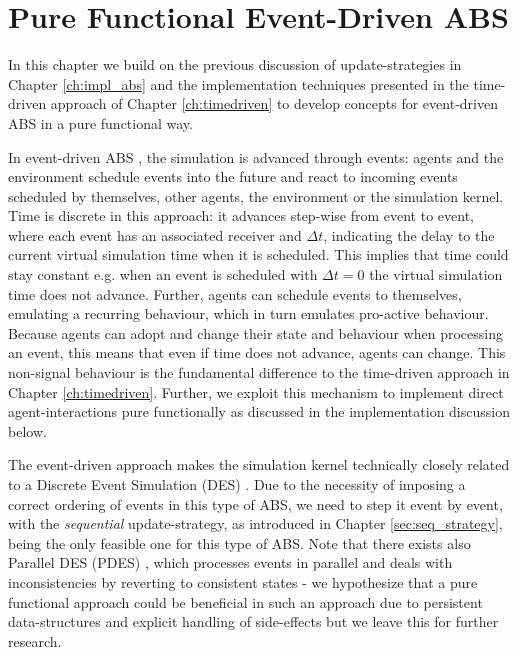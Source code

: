 \chapter{Pure Functional Event-Driven ABS}
\label{ch:eventdriven}

In this chapter we build on the previous discussion of update-strategies in Chapter \ref{ch:impl_abs} and the implementation techniques presented in the time-driven approach of Chapter \ref{ch:timedriven} to develop concepts for event-driven ABS in a pure functional way. 

In event-driven ABS \cite{meyer_event-driven_2014}, the simulation is advanced through events: agents and the environment schedule events into the future and react to incoming events scheduled by themselves, other agents, the environment or the simulation kernel. Time is discrete in this approach: it advances step-wise from event to event, where each event has an associated receiver and $\Delta t$, indicating the delay to the current virtual simulation time when it is scheduled. This implies that time could stay constant e.g. when an event is scheduled with $\Delta t = 0$ the virtual simulation time does not advance. Further, agents can schedule events to themselves, emulating a recurring behaviour, which in turn emulates pro-active behaviour. Because agents can adopt and change their state and behaviour when processing an event, this means that even if time does not advance, agents can change. This non-signal behaviour is the fundamental difference to the time-driven approach in Chapter \ref{ch:timedriven}. Further, we exploit this mechanism to implement direct agent-interactions pure functionally as discussed in the implementation discussion below.

The event-driven approach makes the simulation kernel technically closely related to a Discrete Event Simulation (DES) \cite{zeigler_theory_2000}. Due to the necessity of imposing a correct ordering of events in this type of ABS, we need to step it event by event, with the \textit{sequential} update-strategy, as introduced in Chapter \ref{sec:seq_strategy}, being the only feasible one for this type of ABS. Note that there exists also Parallel DES (PDES) \cite{fujimoto_parallel_1990}, which processes events in parallel and deals with inconsistencies by reverting to consistent states - we hypothesize that a pure functional approach could be beneficial in such an approach due to persistent data-structures and explicit handling of side-effects but we leave this for further research.

